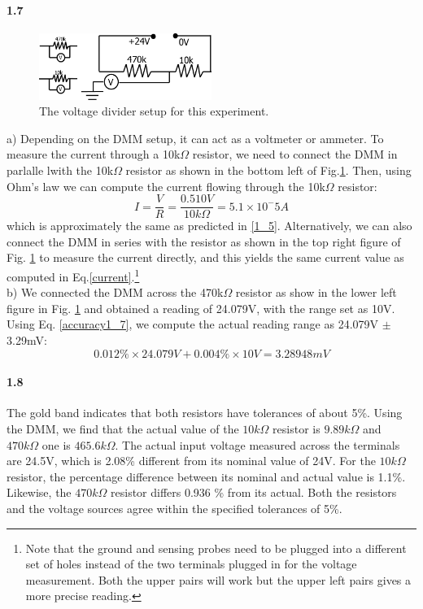 \documentclass[authoryear, 12pt,5p, times]{elsarticle}
\begin{document}
\paragraph{\textbf{1.7}} 
\begin{figure}[h!]
\center
\includegraphics[width=0.5\textwidth]{figure/1_7_setup}
\caption{The voltage divider setup for this experiment.}
\label{voltage_divider}
\end{figure}
a) Depending on the DMM setup, it can act as a voltmeter or ammeter. To measure the current through a 10k$\Omega$ resistor, we need to connect the DMM in parlalle lwith the 10k$\Omega$ resistor as shown in the bottom left of Fig.\ref{voltage_divider}.
Then, using Ohm's law we can compute the current flowing through the 10k$\Omega$ resistor: 
\begin{equation}
I = \frac{V}{R}=\frac{0.510V}{10k\Omega}=5.1\times 10^-5 A
\label{current}
\end{equation}
which is approximately the same as predicted in \ref{1_5}. Alternatively, we can also connect the DMM in series with the resistor as shown in the top right figure of Fig. \ref{voltage_divider}  to measure the current directly, and this yields the same current value as computed in Eq.\ref{current}.\footnote{Note that the ground and sensing probes need to be plugged into a different set of holes instead of the two terminals plugged in for the voltage measurement. Both the upper pairs will work but the upper left pairs  gives a more precise reading.} 
\\
b)  We connected the DMM across the  470k$\Omega$ resistor as show in the lower left figure in Fig. \ref{voltage_divider} and obtained a reading of 24.079V, with the range set as 10V. Using Eq. \ref{accuracy1_7}, we compute the actual reading range as 24.079V $\pm $3.29mV:
\begin{equation}
0.012\% \times 24.079V+0.004\%\times10V=3.28948mV
\label{accuracy1_7}
\end{equation}
\paragraph{\textbf{1.8}} 
The gold band indicates that both resistors have tolerances of about 5\%. Using the DMM, we find that the actual value of the \(10k\Omega\) resistor is \(9.89k\Omega \) and  \(470k\Omega\) one is \(465.6k\Omega\). The actual input voltage measured across the terminals are 24.5V, which is 2.08\% different from its nominal value of 24V. For the \(10k\Omega \) resistor, the percentage difference between its nominal and actual value is 1.1\%. Likewise, the \(470k\Omega\) resistor differs  0.936 \%  from its actual. Both the resistors and the voltage sources agree within the specified tolerances of 5\%.   
\end{document}
